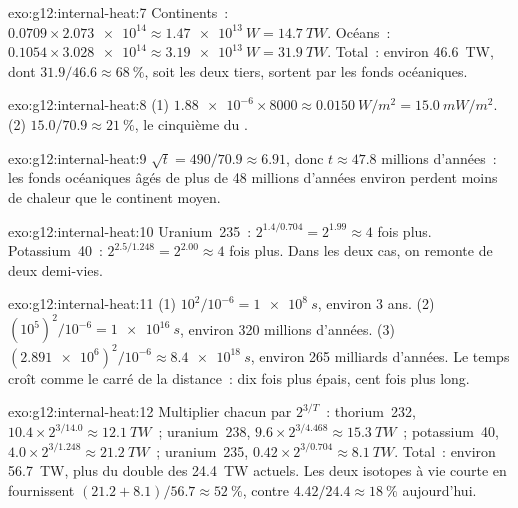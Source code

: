 \begin{solution}{exo:g12:internal-heat:7}
Continents~: $0.0709 \times \num{2.073e14} \approx \qty{1.47e13}{W} =
\qty{14.7}{TW}$. Océans~: $0.1054 \times \num{3.028e14} \approx
\qty{3.19e13}{W} = \qty{31.9}{TW}$. Total~: environ \qty{46.6}{TW}, dont
$31.9/46.6 \approx \qty{68}{\percent}$, soit les deux tiers, sortent par
les fonds océaniques.
\end{solution}

\begin{solution}{exo:g12:internal-heat:8}
(1) $\num{1.88e-6} \times 8000 \approx \qty{0.0150}{W/m^2} = \qty{15.0}{mW/m^2}$.
(2) $15.0/70.9 \approx \qty{21}{\percent}$, le cinquième du .
\end{solution}

\begin{solution}{exo:g12:internal-heat:9}
$\sqrt{t} = 490/70.9 \approx 6.91$, donc $t \approx 47.8$ millions
d'années~: les fonds océaniques âgés de plus de 48 millions d'années
environ perdent moins de chaleur que le continent moyen.
\end{solution}

\begin{solution}{exo:g12:internal-heat:10}
Uranium~235~: $2^{1.4/0.704} = 2^{1.99} \approx 4$ fois plus.
Potassium~40~: $2^{2.5/1.248} = 2^{2.00} \approx 4$ fois plus. Dans les
deux cas, on remonte de deux demi-vies.
\end{solution}

\begin{solution}{exo:g12:internal-heat:11}
(1) $10^2/10^{-6} = \qty{1e8}{s}$, environ 3 ans. (2) $(10^5)^2/10^{-6} =
\qty{1e16}{s}$, environ 320 millions d'années. (3) $(\num{2.891e6})^2/10^{-6}
\approx \qty{8.4e18}{s}$, environ 265 milliards d'années. Le temps croît
comme le carré de la distance~: dix fois plus épais, cent fois plus long.
\end{solution}

\begin{solution}{exo:g12:internal-heat:12}
Multiplier chacun par $2^{3/T}$~: thorium~232, $10.4 \times 2^{3/14.0} \approx
\qty{12.1}{TW}$~; uranium~238, $9.6 \times 2^{3/4.468} \approx \qty{15.3}{TW}$~;
potassium~40, $4.0 \times 2^{3/1.248} \approx \qty{21.2}{TW}$~; uranium~235,
$0.42 \times 2^{3/0.704} \approx \qty{8.1}{TW}$. Total~: environ
\qty{56.7}{TW}, plus du double des \qty{24.4}{TW} actuels. Les deux
isotopes à vie courte en fournissent
$(21.2 + 8.1)/56.7 \approx \qty{52}{\percent}$, contre
$4.42/24.4 \approx \qty{18}{\percent}$ aujourd'hui.
\end{solution}

